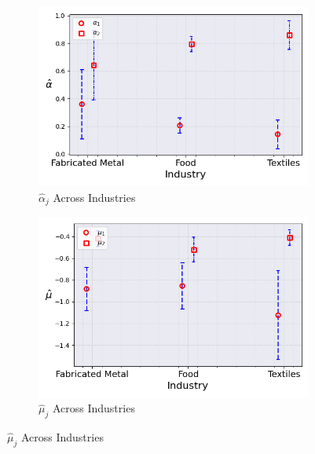 \documentclass{article}
\begin{document}
\begin{figure}[ht!]
    \centering 
    \caption{AR(1) Normal Model Across Industries ($M_0 = 2$)}
    \begin{subfigure}[t]{0.32\textwidth}
        \centering
        \includegraphics[width=\textwidth]{figure/ar1_normal_alpha_across_industries_m2.png}
        \caption{$\hat\alpha_j$ Across Industries}
    \end{subfigure}
    \begin{subfigure}[t]{0.32\textwidth}
        \centering
        \includegraphics[width=\textwidth]{figure/ar1_normal_mu_across_industries_m2.png}
        \caption{$\hat\mu_{j}$ Across Industries}
    \end{subfigure}
    

\end{figure}
\end{document}
